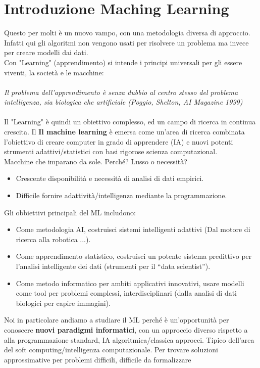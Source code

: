 \newpage
\section{Introduzione Maching Learning}
Questo per molti è un nuovo vampo, con una metodologia diversa di approccio. Infatti qui gli algoritmi non vengono usati
per risolvere un problema ma invece per creare modelli dai dati.\\
Con "Learning" (apprendimento) si intende i principi universali per gli essere viventi, la società e le macchine:\\\\
\textit{Il problema dell’apprendimento è senza dubbio al centro stesso del problema intelligenza, sia biologica che artificiale (Poggio, Shelton, AI Magazine 1999)}\\\\
Il "Learning" è quindi un obiettivo complesso, ed un campo di ricerca in continua crescita.
Il \textbf{Il machine learning} è emersa come un’area di ricerca combinata l'obiettivo di creare computer in grado di apprendere (IA) e nuovi potenti strumenti adattivi/statistici con basi rigorose scienza computazional.\\
Macchine che imparano da sole. Perché? Lusso o necessità?
\begin{itemize}
    \item Crescente disponibilità e necessità di analisi di dati empirici.
    \item Difficile fornire adattività/intelligenza mediante la programmazione.
\end{itemize}
Gli obbiettivi principali del ML includono:
\begin{itemize}
    \item Come metodologia AI, costruisci sistemi intelligenti adattivi (Dal motore di ricerca alla robotica ...).
    \item Come apprendimento statistico, costruisci un potente sistema predittivo per l'analisi intelligente dei dati (strumenti per il “data scientist”).
    \item Come metodo informatico per ambiti applicativi innovativi, usare modelli come tool per problemi complessi, interdisciplinari (dalla analisi di dati biologici per capire immagini).
\end{itemize}
Noi in particolare andiamo a studiare il ML perché è un'opportunità per conoscere \textbf{nuovi paradigmi informatici}, con un approccio diverso rispetto a alla programmazione standard, IA algoritmica/classica approcci. 
Tipico dell'area del soft computing/intelligenza computazionale. Per trovare soluzioni approssimative per problemi difficili, difficile da formalizzare
